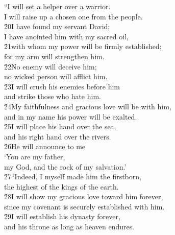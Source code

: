 \begin{poetry}
\poeml ``I will set a helper over a warrior. \\
\poemll    I will raise up a chosen one from the people. \\
\poeml \v{20}I have found my servant David; \\
\poemll    I have anointed him with my sacred oil, \\
\poeml \v{21}with whom my power will be firmly established; \\
\poemll    for my arm will strengthen him. \\
\poeml \v{22}No enemy will deceive him; \\
\poemll    no wicked person will afflict him. \\
\poemll    \v{23}I will crush his enemies before him \\
\poemll    and strike those who hate him. \\
\poemll    \v{24}My faithfulness and gracious love will be with him, \\
\poemll    and in my name his power will be exalted. \\
\poeml \v{25}I will place his hand over the sea, \\
\poemll    and his right hand over the rivers. \\
\poeml \v{26}He will announce to me \\
\poemll    `You are my father, \\
\poemlll       my God, and the rock of my salvation.' \\
\poeml \v{27}``Indeed, I myself made him the firstborn, \\
\poemll    the highest of the kings of the earth. \\
\poeml \v{28}I will show my gracious love toward him forever, \\
\poemll    since my covenant is securely established with him. \\
\poeml \v{29}I will establish his dynasty forever, \\
\poemll    and his throne as long as heaven endures. \\

\end{poetry}
